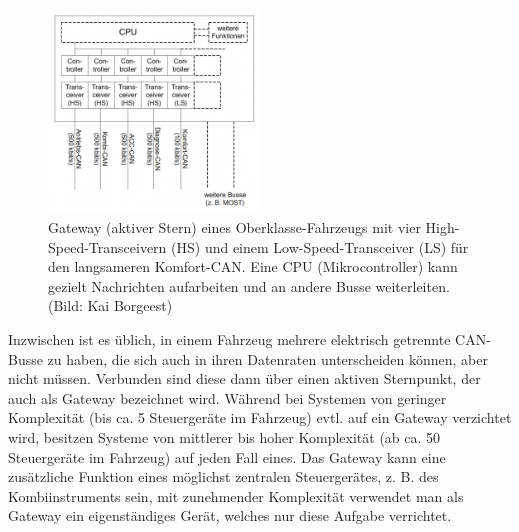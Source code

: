 \begin{figure}[!ht]%
\centering
\includegraphics[width=0.5\textwidth]{images/CAN/CAN-8.pdf}
\caption{Gateway (aktiver Stern) eines Oberklasse-Fahrzeugs mit vier
High-Speed-Transceivern (HS) und einem Low-Speed-Transceiver (LS) für
den langsameren Komfort-CAN. Eine CPU (Mikrocontroller) kann gezielt
Nachrichten aufarbeiten und an andere Busse weiterleiten. (Bild: Kai
Borgeest)}
\end{figure}

Inzwischen ist es üblich, in einem Fahrzeug mehrere elektrisch getrennte
CAN-Busse zu haben, die sich auch in ihren Datenraten unterscheiden
können, aber nicht müssen. Verbunden sind diese dann über einen aktiven
Sternpunkt, der auch als Gateway bezeichnet wird. Während bei Systemen
von geringer Komplexität (bis ca. 5 Steuergeräte im Fahrzeug) evtl. auf
ein Gateway verzichtet wird, besitzen Systeme von mittlerer bis hoher
Komplexität (ab ca. 50 Steuergeräte im Fahrzeug) auf jeden Fall eines.
Das Gateway kann eine zusätzliche Funktion eines möglichst zentralen
Steuergerätes, z. B. des Kombiinstruments sein, mit zunehmender
Komplexität verwendet man als Gateway ein eigenständiges Gerät, welches
nur diese Aufgabe verrichtet.

